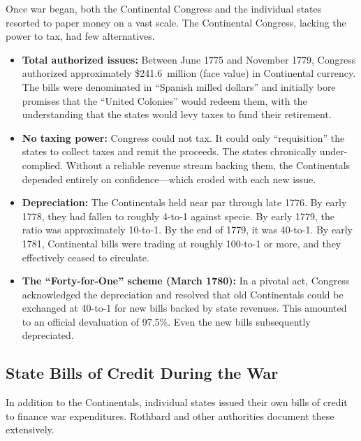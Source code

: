 \documentclass[12pt]{article}
\begin{document}
Once war began, both the Continental Congress and the individual states resorted
to paper money on a vast scale.  The Continental Congress, lacking the power to
tax, had few alternatives.

\begin{itemize}
    \item \textbf{Total authorized issues:} Between June 1775 and November 1779,
    Congress authorized approximately \$241.6~million (face value) in
    Continental currency.  The bills were denominated in ``Spanish milled
    dollars'' and initially bore promises that the ``United Colonies'' would
    redeem them, with the understanding that the states would levy taxes to
    fund their retirement.

    \item \textbf{No taxing power:} Congress could not tax.  It could only
    ``requisition'' the states to collect taxes and remit the proceeds.  The
    states chronically under-complied.  Without a reliable revenue stream
    backing them, the Continentals depended entirely on confidence---which
    eroded with each new issue.

    \item \textbf{Depreciation:} The Continentals held near par through late
    1776.  By early 1778, they had fallen to roughly 4-to-1 against specie.
    By early 1779, the ratio was approximately 10-to-1.  By the end of 1779,
    it was 40-to-1.  By early 1781, Continental bills were trading at
    roughly 100-to-1 or more, and they effectively ceased to circulate.

    \item \textbf{The ``Forty-for-One'' scheme (March 1780):} In a pivotal act,
    Congress acknowledged the depreciation and resolved that old Continentals
    could be exchanged at 40-to-1 for new bills backed by state revenues.  This
    amounted to an official devaluation of 97.5\%.  Even the new bills
    subsequently depreciated.
\end{itemize}

\subsection{State Bills of Credit During the War}

In addition to the Continentals, individual states issued their own bills of
credit to finance war expenditures.  Rothbard and other authorities document
these extensively.
\end{document}
